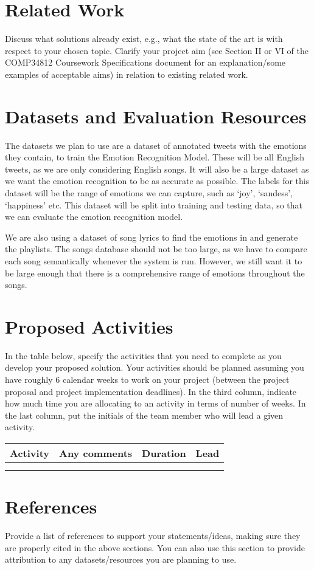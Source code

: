 \documentclass[11pt]{article}
\begin{document}
\section{Related Work}
Discuss what solutions already exist, e.g., what the state of the art is with respect to your chosen topic. Clarify your project aim (see Section II or VI of the COMP34812 Coursework Specifications document for an explanation/some examples of acceptable aims) in relation to existing related work.

\section{Datasets and Evaluation Resources}
The datasets we plan to use are a dataset of annotated tweets\cite{gupta_2021}\cite{pandey_2022} with the emotions they contain, to train the Emotion Recognition Model. These will be all English tweets, as we are only considering English songs. It will also be a large dataset as we want the emotion recognition to be as accurate as possible. The labels for this dataset will be the range of emotions we can capture, such as `joy', `sandess', `happiness' etc. This dataset will be split into training and testing data, so that we can evaluate the emotion recognition model.

We are also using a dataset of song lyrics\cite{shah_2021} to find the emotions in and generate the playlists. The songs database should not be too large, as we have to compare each song semantically whenever the system is run. However, we still want it to be large enough that there is a comprehensive range of emotions throughout the songs.

\section{Proposed Activities}
In the table below, specify the activities that you need to complete as you develop your proposed solution. Your activities should be planned assuming you have roughly 6 calendar weeks to work on your project (between the project proposal and project implementation deadlines). In the third column, indicate how much time you are allocating to an activity in terms of number of weeks. In the last column, put the initials of the team member who will lead a given activity.

\begin{table}[h]
\centering
\begin{tabular}{|l|l|c|c|}
\hline
\textbf{Activity} & \textbf{Any comments} & \textbf{Duration} & \textbf{Lead}\\
\hline
& & & \\
\hline
& & & \\
\hline
\end{tabular}
\end{table}


\section*{References}
Provide a list of references to support your statements/ideas, making sure they are properly cited in the above sections. You can also use this section to provide attribution to any datasets/resources you are planning to use.


\end{document}
